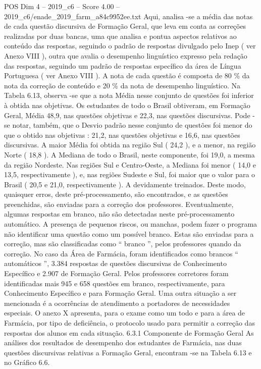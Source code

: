 \begin{textsample}{POS Dim 4 – 2019\_c6 – Score 4.00 – 2019\_c6/enade\_2019\_farm\_a84c9952ee.txt}
Aqui, analisa -se a média das notas de cada questão discursiva de Formação Geral, que leva em conta as correções realizadas por duas bancas, uma que analisa e pontua aspectos relativos ao conteúdo das respostas, seguindo o padrão de respostas divulgado pelo Inep ( ver Anexo VIII ), outra que avalia o desempenho linguístico expresso pela redação das respostas, seguindo um padrão de respostas específico da área de Língua Portuguesa ( ver Anexo VIII ).
A nota de cada questão é composta de 80 \% da nota da correção de conteúdo e 20 \% da nota de desempenho linguístico.
Na Tabela 6.13, observa -se que a nota Média nesse conjunto de questões foi inferior à obtida nas objetivas.
Os estudantes de todo o Brasil obtiveram, em Formação Geral, Média 48,9, nas questões objetivas e 22,3, nas questões discursivas.
Pode -se notar, também, que o Desvio padrão nesse conjunto de questões foi menor do que o obtido nas objetivas : 21,2, nas questões objetivas e 16,6, nas questões discursivas.
A maior Média foi obtida na região Sul ( 24,2 ), e a menor, na região Norte ( 18,8 ).
A Mediana de todo o Brasil, neste componente, foi 19,0, a mesma da região Nordeste.
Nas regiões Sul e Centro-Oeste, a Mediana foi menor ( 14,0 e 13,5, respectivamente ), e, nas regiões Sudeste e Sul, foi maior que o valor para o Brasil ( 20,5 e 21,0, respectivamente ).
A devidamente treinados.
Deste modo, quaisquer erros, deste pré-processamento, são encontrados, e as questões preenchidas, são enviadas para a correção dos professores.
Eventualmente, algumas respostas em branco, não são detectadas neste pré-processamento automático.
A presença de pequenos riscos, ou manchas, podem fazer o programa não identificar uma questão como um possível branco.
Estas são enviadas para a correção, mas são classificadas como “ branco ”, pelos professores quando da correção.
No caso da Área de Farmácia, foram identificados como brancos “ automáticos ”, 3.384 respostas de questões discursivas de Conhecimento Específico e 2.907 de Formação Geral.
Pelos professores corretores foram identificadas mais 945 e 658 questões em branco, respectivamente, para Conhecimento Específico e para Formação Geral.
Uma outra situação a ser mencionada é a ocorrências de atendimento a portadores de necessidades especiais.
O anexo X apresenta, para o exame como um todo e para a área de Farmácia, por tipo de deficiência, o protocolo usado para permitir a correção das respostas dos alunos em cada situação. 6.3.1 Componente de Formação Geral As análises dos resultados de desempenho dos estudantes de Farmácia, nas duas questões discursivas relativas a Formação Geral, encontram -se na Tabela 6.13 e no Gráfico 6.6.

\end{textsample}
